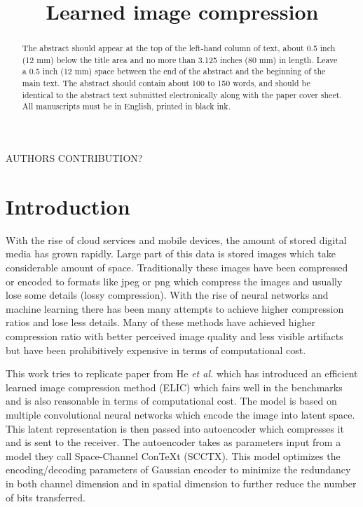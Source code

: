 \documentclass{article}
\title{Learned image compression}
\begin{document}
%
\maketitle
%
\begin{abstract}
The abstract should appear at the top of the left-hand column of text, about
0.5 inch (12 mm) below the title area and no more than 3.125 inches (80 mm) in
length.  Leave a 0.5 inch (12 mm) space between the end of the abstract and the
beginning of the main text.  The abstract should contain about 100 to 150
words, and should be identical to the abstract text submitted electronically
along with the paper cover sheet.  All manuscripts must be in English, printed
in black ink.
\end{abstract}
%
\begin{keywords}
AUTHORS CONTRIBUTION?
\end{keywords}
%
\section{Introduction} %
\label{sec:intro}
With the rise of cloud services and mobile devices, the amount of stored digital media has grown rapidly. 
Large part of this data is stored images which take considerable amount of space.
Traditionally these images have been compressed or encoded to formats like jpeg or png which compress the images and usually lose some details (lossy compression).
With the rise of neural networks and machine learning there has been many attempts to achieve higher compression ratios and lose less details.
Many of these methods have achieved higher compression ratio with better perceived image quality and less visible artifacts but have been prohibitively expensive in terms of computational cost.

This work tries to replicate paper from He \textit{et al.}\cite{ELIC} which has introduced an efficient learned image compression method (ELIC) which fairs well in the benchmarks and is also reasonable in terms of computational cost.
The model is based on multiple convolutional neural networks which encode the image into latent space.
This latent representation is then passed into autoencoder which compresses it and is sent to the receiver. 
The autoencoder takes as parameters input from a model they call Space-Channel ConTeXt (SCCTX).
This model optimizes the encoding/decoding parameters of Gaussian encoder to minimize the redundancy in both channel dimension and in spatial dimension to further reduce the number of bits transferred.
\end{document}
